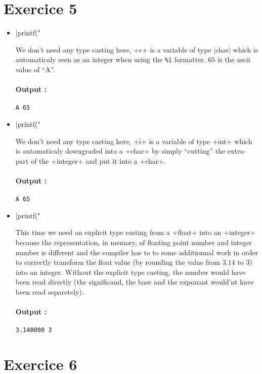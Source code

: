 \documentclass[a4paper,11pt]{report}
\begin{document}
\section*{Exercice 5}

\begin{itemize}
\item \cinline|printf("%

  We don't need any type casting here, \cinline+c+ is a variable of type
  \cinline|char| which is automaticaly seen as an integer when using the
  \verb+%i+ formatter. $65$ is the ascii value of ``A''.

  \paragraph{Output : } \verb+A 65+
  
\item \cinline|printf("%

  We don't need any type casting here, \cinline+i+ is a variable of type
  \cinline+int+ which is automaticaly downgraded into a \cinline+char+ by simply
  ``cutting'' the extra-part of the \cinline+integer+ and put it into a
  \cinline+char+.
  
  \paragraph{Output : } \verb+A 65+
  
\item \cinline|printf("%

  This time we need an explicit type casting from a \cinline+float+ into an
  \cinline+integer+ because the representation, in memory, of floating point
  number and integer number is different and the compiler has to to some
  additionnal work in order to correctly transform the float value (by rounding
  the value from $3.14$ to $3$) into an integer. Without the explicit type
  casting, the number would have been read directly (the significand, the base
  and the exponant would'nt have been read separetely).
  
  \paragraph{Output : } \verb+3.140000 3+

\end{itemize}

\section*{Exercice 6}
\end{document}
